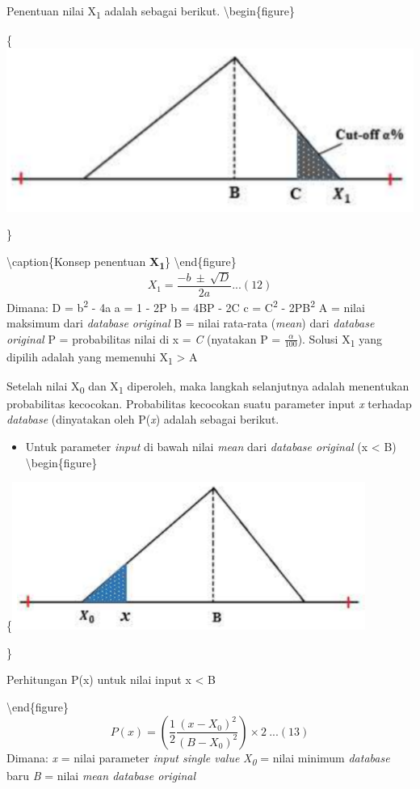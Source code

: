\documentclass[
]{book}
\providecommand{\tightlist}{%
  \setlength{\itemsep}{0pt}\setlength{\parskip}{0pt}}
\begin{document}
Penentuan nilai X\textsubscript{1} adalah sebagai berikut.
\textbackslash begin\{figure\}

\{\centering \includegraphics[width=0.5\linewidth]{images/screening/X1}

\}

\textbackslash caption\{Konsep penentuan \textbf{X\textsubscript{1}}\}\label{fig:unnamed-chunk-19}
\textbackslash end\{figure\}
\[X_1 = \frac{-b\ ±\ \sqrt{D} }{2a}...(12)\]
Dimana:
D = b\textsuperscript{2} - 4a
a = 1 - 2P
b = 4BP - 2C
c = C\textsuperscript{2} - 2PB\textsuperscript{2}
A = nilai maksimum dari \emph{database original}
B = nilai rata-rata (\emph{mean}) dari \emph{database original}
P = probabilitas nilai di x = \emph{C} (nyatakan P = \(\frac{\alpha}{100}\)).
Solusi X\textsubscript{1} yang dipilih adalah yang memenuhi X\textsubscript{1} \textgreater{} A

Setelah nilai X\textsubscript{0} dan X\textsubscript{1} diperoleh, maka langkah selanjutnya adalah menentukan probabilitas kecocokan. Probabilitas kecocokan suatu parameter input \emph{x} terhadap \emph{database} (dinyatakan oleh P(\emph{x}) adalah sebagai berikut.

\begin{itemize}
\tightlist
\item
  Untuk parameter \emph{input} di bawah nilai \emph{mean} dari \emph{database original} (x \textless{} B)
  \textbackslash begin\{figure\}
\end{itemize}

\{\centering \includegraphics[width=0.5\linewidth]{images/screening/kecilB}

\}

\caption{Perhitungan P(x) untuk nilai input x < B}

\label{fig:unnamed-chunk-20}
\textbackslash end\{figure\}
\[P(x) = \left( \frac{1}{2}\frac{(x-X_0)^2}{(B-X_0)^2} \right) \times 2\  ...(13)\]
Dimana:
\emph{x} = nilai parameter \emph{input single value}
\emph{X\textsubscript{0}} = nilai minimum \emph{database} baru
\emph{B} = nilai \emph{mean database original}
\end{document}
